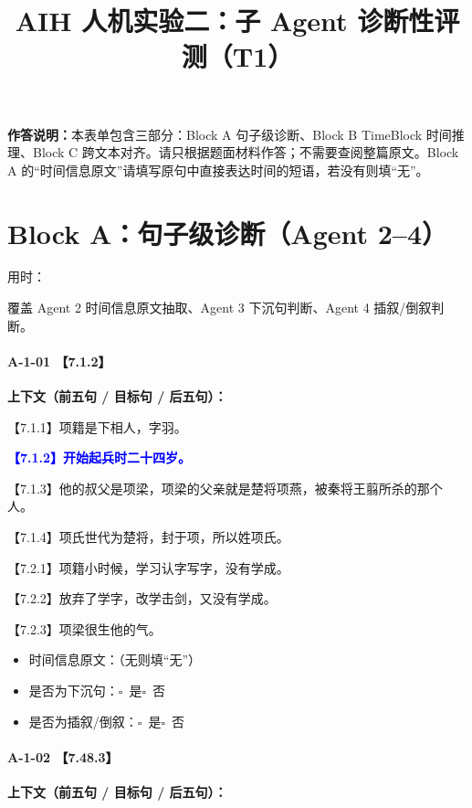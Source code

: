\documentclass[fontset=none,11pt,a4paper]{ctexart}
\title{\textbf{AIH 人机实验二：子 Agent 诊断性评测（T1）}}
\author{}
\date{}
\newcommand{\answerline}[1]{\underline{\hspace{#1}}}
\newcommand{\choicebox}[1]{$\square$~#1}
\newcommand{\blocktime}{\vspace{0.25em}\noindent 用时：\answerline{4cm}\par\vspace{0.6em}}
\begin{document}
\maketitle
\vspace{-2em}

\textbf{作答说明：}本表单包含三部分：Block A 句子级诊断、Block B TimeBlock 时间推理、Block C 跨文本对齐。请只根据题面材料作答；不需要查阅整篇原文。Block A 的“时间信息原文”请填写原句中直接表达时间的短语，若没有则填“无”。

\section{Block A：句子级诊断（Agent 2--4）}
\blocktime
覆盖 Agent 2 时间信息原文抽取、Agent 3 下沉句判断、Agent 4 插叙/倒叙判断。

\paragraph{A-1-01 \quad 【7.1.2】}
\textbf{上下文（前五句 / 目标句 / 后五句）：}

\noindent 【7.1.1】项籍是下相人，字羽。\par
\noindent \textcolor{blue}{\textbf{【7.1.2】开始起兵时二十四岁。}}\par
\noindent 【7.1.3】他的叔父是项梁，项梁的父亲就是楚将项燕，被秦将王翦所杀的那个人。\par
\noindent 【7.1.4】项氏世代为楚将，封于项，所以姓项氏。\par
\noindent 【7.2.1】项籍小时候，学习认字写字，没有学成。\par
\noindent 【7.2.2】放弃了学字，改学击剑，又没有学成。\par
\noindent 【7.2.3】项梁很生他的气。\par

\begin{itemize}
  \item 时间信息原文：\answerline{7.5cm}（无则填“无”）
  \item 是否为下沉句：\choicebox{是}\quad \choicebox{否}
  \item 是否为插叙/倒叙：\choicebox{是}\quad \choicebox{否}
\end{itemize}

\paragraph{A-1-02 \quad 【7.48.3】}
\textbf{上下文（前五句 / 目标句 / 后五句）：}
\end{document}
